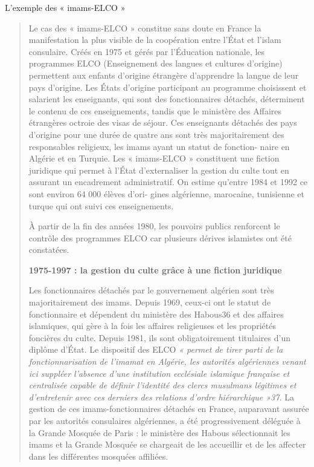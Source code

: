L'exemple des « imams-ELCO »

\begin{quote}
Le cas des « imams-ELCO » constitue sans doute en France la
manifestation la plus visible de la coopération entre l'État et l'islam
consulaire. Créés en 1975 et gérés par l'Éducation nationale, les
programmes ELCO (Enseignement des langues et cultures d'origine)
permettent aux enfants d'origine étrangère d'apprendre la langue de leur
pays d'origine. Les États d'origine participant au programme choisissent
et salarient les enseignants, qui sont des fonctionnaires détachés,
déterminent le contenu de ces enseignements, tandis que le ministère des
Affaires étrangères octroie des visas de séjour. Ces enseignants
détachés des pays d'origine pour une durée de quatre ans sont très
majoritairement des responsables religieux, les imams ayant un statut de
fonction- naire en Algérie et en Turquie. Les « imams-ELCO » constituent
une fiction juridique qui permet à l'État d'externaliser la gestion du
culte tout en assurant un encadrement administratif. On estime qu'entre
1984 et 1992 ce sont environ 64 000 élèves d'ori- gines algérienne,
marocaine, tunisienne et turque qui ont suivi ces enseignements.

À partir de la fin des années 1980, les pouvoirs publics renforcent le
contrôle des programmes ELCO car plusieurs dérives islamistes ont été
constatées.

\textbf{1975-1997 : la gestion du culte grâce à une fiction juridique}

Les fonctionnaires détachés par le gouvernement algérien sont très
majoritairement des imams. Depuis 1969, ceux-ci ont le statut de
fonctionnaire et dépendent du ministère des Habous36 et des affaires
islamiques, qui gère à la fois les affaires religieuses et les
propriétés foncières du culte. Depuis 1981, ils sont obligatoirement
titulaires d'un diplôme d'État. Le dispositif des ELCO \emph{« permet de
tirer parti de la fonctionnarisation de l'imamat en Algérie, les
autorités algériennes venant ici suppléer l'absence d'une institution
ecclésiale islamique française et centralisée capable de définir
l'identité des clercs musulmans légitimes et d'entretenir avec ces
derniers des relations d'ordre hiérarchique »37.} La gestion de ces
imams-fonctionnaires détachés en France, auparavant assurée par les
autorités consulaires algériennes, a été progressivement déléguée à la
Grande Mosquée de Paris : le ministère des Habous sélectionnait les
imams et la Grande Mosquée se chargeait de les accueillir et de les
affecter dans les différentes mosquées affiliées.


\end{quote}

